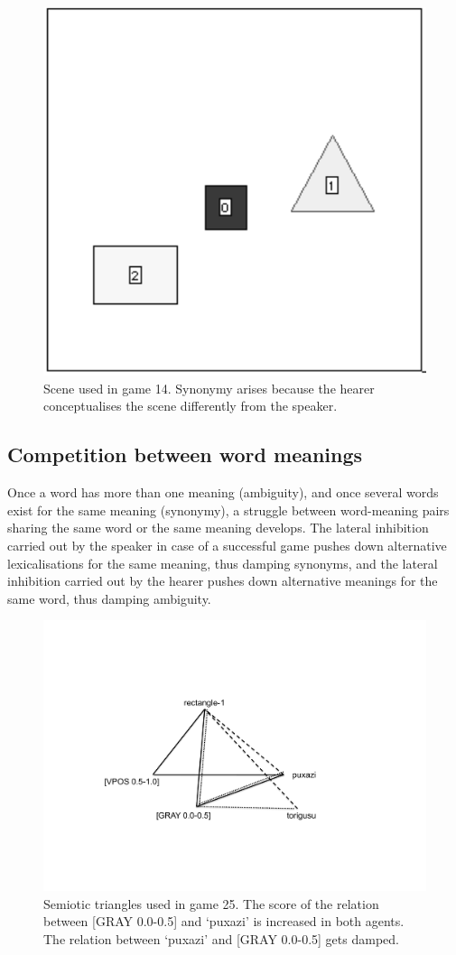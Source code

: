 \begin{figure}[htbp]
  \centerline{\includegraphics[width=.40\textwidth]{chap6/figs/scene-game14}}
\caption{\label{scene-game14} Scene used
in game 14. Synonymy arises because the hearer conceptualises
the scene differently from the speaker.}
\end{figure}

\subsection{Competition between word meanings }

Once a word has more than one meaning (ambiguity), 
and once several words exist for the same meaning 
(synonymy), a struggle between word-meaning
pairs sharing the same word or the 
same meaning develops. The lateral inhibition carried out by the 
speaker in case of a successful game pushes
down alternative lexicalisations for the same meaning, 
thus damping synonyms, and the lateral inhibition carried out 
by the hearer pushes down alternative meanings for the 
same word, thus damping ambiguity. 


\begin{figure}[htbp]
  \centerline{\includegraphics[width=.60\textwidth]{chap6/figs/triangle5}}
\caption{\label{triangle5} Semiotic triangles used 
in game 25. The score of the relation between [GRAY 0.0-0.5] and 
`puxazi' is increased in both agents. The relation between `puxazi' and 
{}[GRAY 0.0-0.5] gets damped.}
\end{figure}

